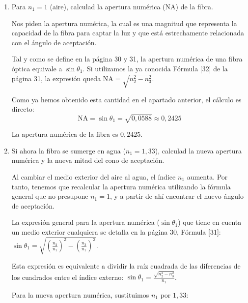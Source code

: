 \documentclass[11pt, a4paper]{article}
\newenvironment{problem}[1][Cuestión]{
	\vspace{0.5cm}
	\noindent{\Large\bfseries #1} \par\vspace{0.5cm}
}{
	\vspace{0.5cm}
}
\begin{document}
\begin{problem}[Problema]
\begin{enumerate}[label=\alph*)]
{					$$\sin \theta_1 = \sqrt{1,48^2 - 1,46^2} = \sqrt{2,1904 - 2,1316} = \sqrt{0,0588} \approx 0,2425$$

					A continuación, despejamos el ángulo resolviendo el arcoseno:

					$$\theta_1 = \arcsin(0,2425) \approx 14,04^\circ$$

					La mitad del ángulo del cono de aceptación es de aproximadamente $\boxed{14,04^\circ}$.
				}

			\item Para $n_1=1$ (aire), calculad la apertura numérica (NA) de la fibra.

				{ \color{blue} 
					Nos piden la apertura numérica, la cual es una magnitud que representa la capacidad de la fibra para captar la luz y que está estrechamente relacionada con el ángulo de aceptación.

					Tal y como se define en la página 30 y 31, la apertura numérica de una fibra óptica equivale a $\sin \theta_1$. Si utilizamos la ya conocida Fórmula [32] de la página 31, la expresión queda $\text{NA} = \sqrt{n_2^2 - n_3^2}$.

					Como ya hemos obtenido esta cantidad en el apartado anterior, el cálculo es directo:
					$$\text{NA} = \sin \theta_1 = \sqrt{0,0588} \approx 0,2425$$

					La apertura numérica de la fibra es $\boxed{0,2425}$.
				}

			\item Si ahora la fibra se sumerge en agua ($n_1=1,33$), calculad la nueva apertura numérica y la nueva mitad del cono de aceptación.

				{ \color{blue} 
					Al cambiar el medio exterior del aire al agua, el índice $n_1$ aumenta. Por tanto, tenemos que recalcular la apertura numérica utilizando la fórmula general que no presupone $n_1 = 1$, y a partir de ahí encontrar el nuevo ángulo de aceptación.

					La expresión general para la apertura numérica ($\sin \theta_1$) que tiene en cuenta un medio exterior cualquiera se detalla en la página 30, Fórmula [31]: $\sin \theta_1 = \sqrt{\left(\frac{n_2}{n_1}\right)^2 - \left(\frac{n_3}{n_1}\right)^2}$. 

					Esta expresión es equivalente a dividir la raíz cuadrada de las diferencias de los cuadrados entre el índice externo: $\sin \theta_1 = \frac{\sqrt{n_2^2 - n_3^2}}{n_1}$.

					Para la nueva apertura numérica, sustituimos $n_1$ por $1,33$:

}
\end{enumerate}
\end{problem}
\end{document}
